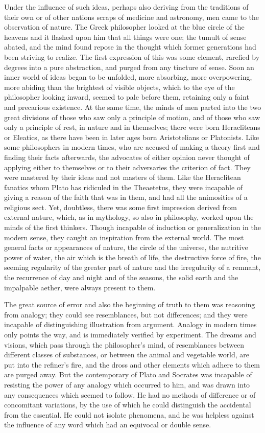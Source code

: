 Under the influence of such ideas, perhaps also deriving from the
traditions of their own or of other nations scraps of medicine and
astronomy, men came to the observation of nature. The Greek philosopher
looked at the blue circle of the heavens and it flashed upon him that all
things were one; the tumult of sense abated, and the mind found repose in
the thought which former generations had been striving to realize. The
first expression of this was some element, rarefied by degrees into a pure
abstraction, and purged from any tincture of sense. Soon an inner world of
ideas began to be unfolded, more absorbing, more overpowering, more
abiding than the brightest of visible objects, which to the eye of the
philosopher looking inward, seemed to pale before them, retaining only a
faint and precarious existence. At the same time, the minds of men parted
into the two great divisions of those who saw only a principle of motion,
and of those who saw only a principle of rest, in nature and in
themselves; there were born Heracliteans or Eleatics, as there have been
in later ages born Aristotelians or Platonists. Like some philosophers in
modern times, who are accused of making a theory first and finding their
facts afterwards, the advocates of either opinion never thought of
applying either to themselves or to their adversaries the criterion of
fact. They were mastered by their ideas and not masters of them. Like the
Heraclitean fanatics whom Plato has ridiculed in the Theaetetus, they were
incapable of giving a reason of the faith that was in them, and had all
the animosities of a religious sect. Yet, doubtless, there was some first
impression derived from external nature, which, as in mythology, so also
in philosophy, worked upon the minds of the first thinkers. Though
incapable of induction or generalization in the modern sense, they caught
an inspiration from the external world. The most general facts or
appearances of nature, the circle of the universe, the nutritive power of
water, the air which is the breath of life, the destructive force of fire,
the seeming regularity of the greater part of nature and the irregularity
of a remnant, the recurrence of day and night and of the seasons, the
solid earth and the impalpable aether, were always present to them.

The great source of error and also the beginning of truth to them was
reasoning from analogy; they could see resemblances, but not differences;
and they were incapable of distinguishing illustration from argument.
Analogy in modern times only points the way, and is immediately verified
by experiment. The dreams and visions, which pass through the
philosopher’s mind, of resemblances between different classes of
substances, or between the animal and vegetable world, are put into the
refiner’s fire, and the dross and other elements which adhere to them are
purged away. But the contemporary of Plato and Socrates was incapable of
resisting the power of any analogy which occurred to him, and was drawn
into any consequences which seemed to follow. He had no methods of
difference or of concomitant variations, by the use of which he could
distinguish the accidental from the essential. He could not isolate
phenomena, and he was helpless against the influence of any word which had
an equivocal or double sense.

